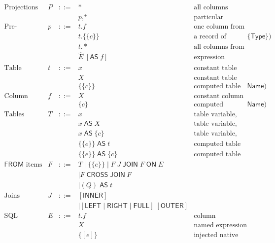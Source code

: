 \documentclass{article}
\newcommand{\mt}[1]{\mathsf{#1}}
\begin{document}
$$\begin{array}{rrcll}
  \textrm{Projections} & P &::=& \ast & \textrm{all columns} \\
  &&& p,^+ & \textrm{particular columns} \\
  \textrm{Pre-projections} & p &::=& t.f & \textrm{one column from a table} \\
  &&& t.\{\{c\}\} & \textrm{a record of columns from a table (of kind $\{\mt{Type}\}$)} \\
  &&& t.* & \textrm{all columns from a table} \\
  &&& \hat{E} \; [\mt{AS} \; f] & \textrm{expression column} \\
  \textrm{Table names} & t &::=& x & \textrm{constant table name (automatically capitalized)} \\
  &&& X & \textrm{constant table name} \\
  &&& \{\{c\}\} & \textrm{computed table name (of kind $\mt{Name}$)} \\
  \textrm{Column names} & f &::=& X & \textrm{constant column name} \\
  &&& \{c\} & \textrm{computed column name (of kind $\mt{Name}$)} \\
  \textrm{Tables} & T &::=& x & \textrm{table variable, named locally by its own capitalization} \\
  &&& x \; \mt{AS} \; X & \textrm{table variable, with local name} \\
  &&& x \; \mt{AS} \; \{c\} & \textrm{table variable, with computed local name} \\
  &&& \{\{e\}\} \; \mt{AS} \; t & \textrm{computed table expression, with local name} \\
  &&& \{\{e\}\} \; \mt{AS} \; \{c\} & \textrm{computed table expression, with computed local name} \\
  \textrm{$\mt{FROM}$ items} & F &::=& T \mid \{\{e\}\} \mid F \; J \; \mt{JOIN} \; F \; \mt{ON} \; E \\
  &&& \mid F \; \mt{CROSS} \; \mt{JOIN} \ F \\
  &&& \mid (Q) \; \mt{AS} \; t \\
  \textrm{Joins} & J &::=& [\mt{INNER}] \\
  &&& \mid [\mt{LEFT} \mid \mt{RIGHT} \mid \mt{FULL}] \; [\mt{OUTER}] \\
  \textrm{SQL expressions} & E &::=& t.f & \textrm{column references} \\
  &&& X & \textrm{named expression references} \\
  &&& \{[e]\} & \textrm{injected native Ur expressions} \\

\end{array}$$
\end{document}
